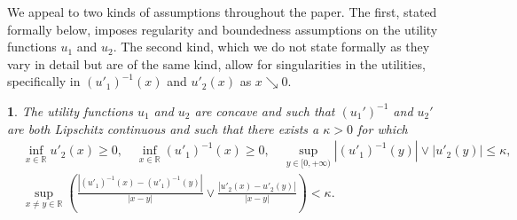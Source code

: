 \documentclass[11pt,oneside,english,reqno,dvipsnames,table]{amsart}
\numberwithin{equation}{section}
\theoremstyle{plain}
\theoremstyle{definition}
\theoremstyle{remark}
\theoremstyle{plain}
\theoremstyle{plain}
\theoremstyle{plain}
\theoremstyle{plain}
\theoremstyle{plain}
\theoremstyle{plain}
\theoremstyle{plain}
\newtheorem{ass}[thm]{\protect\assumptionname}
\providecommand{\assumptionname}{Assumption}
\newcommand{\mbR}{\mathbb{R}}
\numberwithin{thm}{section}
\begin{document}
 
 We appeal to two kinds of assumptions throughout the paper. The first, stated formally below, imposes regularity and boundedness assumptions on the utility functions $u_1$ and $u_2$. The second kind, which we do not state formally as they vary in detail but are of the same kind, allow for singularities in the utilities, specifically in $(u'_1)^{-1}(x)$ and $u'_2(x)$ as $x\searrow 0$.
%
\begin{ass}\label{ass:utility_reg_intro}
     The utility functions $u_1$ and $u_2$ are concave and such that $(u_1')^{-1}$ and $u_2'$ are  both Lipschitz continuous and such that there exists a $\kappa>0$ for which
%
\begin{equation}
\begin{aligned}
     &\inf_{x\in \mbR} u'_2(x) \geq 0, \quad \inf_{x\in \mbR}  (u'_1)^{-1}(x) \geq 0, \quad  \sup_{y \in [0,+\infty)} |(u'_1)^{-1} (y)|\vee |u'_2(y)| \leq \kappa,\\
    & \sup_{x\neq y \in \mbR} \left(\frac{|(u'_1)^{-1}(x)-(u'_1)^{-1}(y)|}{|x-y|} \vee \frac{|u'_2(x)-u'_2(y)|}{|x-y|} \right)<\kappa.
\end{aligned}
\end{equation}
\end{ass}
\end{document}
